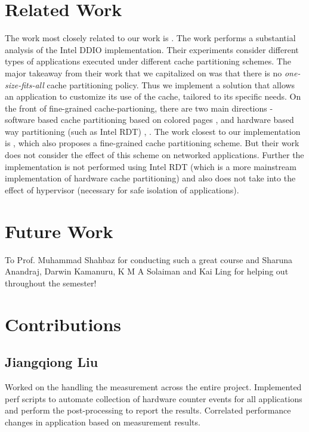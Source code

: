 \documentclass[sigconf,authorversion,noacm]{acmart}
\begin{document}
\section{Related Work}
The work most closely related to our work is \cite{alireza_2020}. The work
performs a substantial analysis of the Intel DDIO implementation. Their
experiments consider different types of applications executed under different
cache partitioning schemes. The major takeaway from their work that we
capitalized on was that there is no \textit{one-size-fits-all} cache
partitioning policy. Thus we implement a solution that allows an application to
customize its use of the cache, tailored to its specific needs. On the front of
fine-grained cache-partioning, there are two main directions - software based
cache partitioning based on colored pages \cite{herter}, \cite{sherwood} and
hardware based way partitioning (such as Intel RDT) \cite{chen}, \cite{assaf}.
The work closest to our implementation is \cite{swap}, which also proposes a
fine-grained cache partitioning scheme. But their work does not consider the
effect of this scheme on networked applications. Further the implementation is
not performed using Intel RDT (which is a more mainstream implementation of
hardware cache partitioning) and also does not take into the effect of
hypervisor (necessary for safe isolation of applications).

\section{Future Work}

\begin{acks}
    To Prof. Muhammad Shahbaz for conducting such a great course and Sharuna
    Anandraj, Darwin Kamanuru, K M A Solaiman and Kai Ling for helping out
    throughout the semester!
\end{acks}





\appendix

\section{Contributions}

\subsection{Jiangqiong Liu}
Worked on the handling the measurement across the entire project. Implemented
perf scripts to automate collection of hardware counter events for all
applications and perform the post-processing to report the results. Correlated
performance changes in application based on measurement results.
\end{document}
